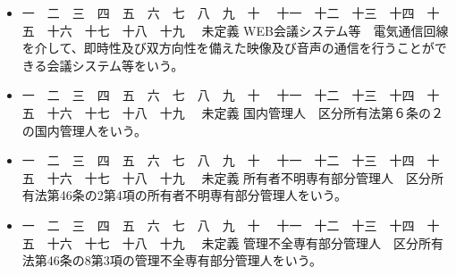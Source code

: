 \documentclass[
  luatex,
  paper=a4paper,
  fontsize=11pt,
  jafontsize=11pt,
  jlreq_notes,
]{jlreq}
\def\toIroha#1{
  \tempvls=#1
  \ifcase\tempvls
    \or イ. \or ロ. \or ハ. \or ニ. \or ホ. \or ヘ. \or ト. \or チ. \or リ.
  \else 未定義
  \fi
}
\def\toKansuji#1{
  \tempvls=#1
  \ifcase\tempvls
    \or 一　\or 二　\or 三　\or 四　\or 五　\or 六　\or 七　\or 八　\or 九　\or 十　
    \or 十一　\or 十二　\or 十三　\or 十四　\or 十五　\or 十六　\or 十七　\or 十八　\or 十九　
  \else 未定義
  \fi
}
\begin{document}
\begin{itemize}[label={}, leftmargin=3em, itemindent=-2em]
\begin{itemize}[label={}, leftmargin=2em, itemindent=-2em]
\begin{enumerate}
              受信者の使用に係る電子計算機に備えられたファイルに記録する方法
            \item 送信者の使用に係る電子計算機に備えられたファイルに記録された情報の内容を電気通信回線を通じて
              情報の提供を受ける者の閲覧に供し、当該情報の提供を受ける者の使用に係る電子計算機に備えられたファイルに
              当該情報を記録する方法
          \end{enumerate}
        \item \toIroha{2}電磁的記録媒体をもって調製するファイルに情報を記録したものを交付する方法
      \end{itemize}
    \item \toKansuji{12}WEB会議システム等　電気通信回線を介して、即時性及び双方向性を備えた映像及び音声の通信を行うことができる会議システム等をいう。
    \item \toKansuji{13}国内管理人　区分所有法第６条の２の国内管理人をいう。
    \item \toKansuji{14}所有者不明専有部分管理人　区分所有法第46条の2第4項の所有者不明専有部分管理人をいう。
    \item \toKansuji{15}管理不全専有部分管理人　区分所有法第46条の8第3項の管理不全専有部分管理人をいう。
  \end{itemize}
\end{document}
